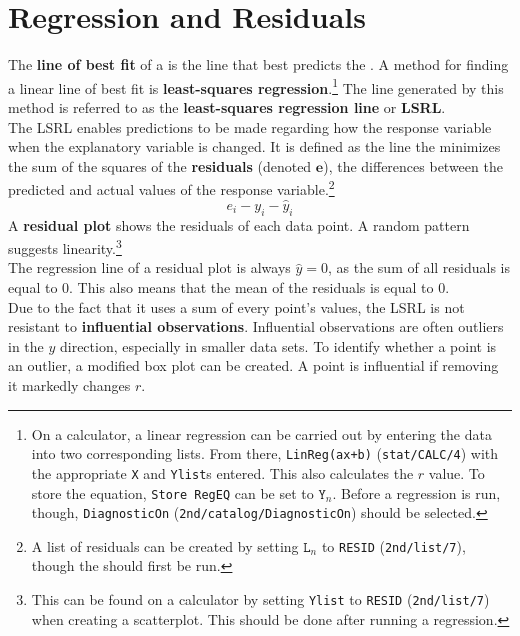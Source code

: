 \documentclass[../AP_Statistics.tex]{subfiles}
\begin{document}
		\section{Regression and Residuals}
			The \textbf{line of best fit} of a  is the line that best predicts the . A method for finding a linear line of best fit is \textbf{least-squares regression}.\footnote{On a calculator, a linear regression can be carried out by entering the data into two corresponding lists. From there, \texttt{LinReg(ax+b)} (\texttt{stat/CALC/4}) with the appropriate \texttt{X} and \texttt{Ylist}s entered. This also calculates the $r$ value. To store the equation, \texttt{Store RegEQ} can be set to $\texttt{Y}_n$. Before a regression is run, though, \texttt{DiagnosticOn} (\texttt{2nd/catalog/DiagnosticOn}) should be selected.} The line generated by this method is referred to as the \textbf{least-squares regression line} or \textbf{LSRL}. \\
			The LSRL enables predictions to be made regarding how the response variable when the explanatory variable is changed. It is defined as the line the minimizes the sum of the squares of the \textbf{residuals} (denoted $\bm{e}$), the differences between the predicted and actual values of the response variable.\footnote{A list of residuals can be created by setting $\texttt{L}_n$ to \texttt{RESID} (\texttt{2nd/list/7}), though the  should first be run.}
			\[e_i - y_i - \hat{y}_i\]
			A \textbf{residual plot} shows the residuals of each data point. A random pattern suggests linearity.\footnote{This can be found on a calculator by setting \texttt{Ylist} to \texttt{RESID} (\texttt{2nd/list/7}) when creating a scatterplot. This should be done after running a regression.} \\
			The regression line of a residual plot is always $\hat{y} = 0$, as the sum of all residuals is equal to 0. This also means that the mean of the residuals is equal to 0. \\
			Due to the fact that it uses a sum of every point's values, the LSRL is not resistant to \textbf{influential observations}. Influential observations are often outliers in the $y$ direction, especially in smaller data sets. To identify whether a point is an outlier, a modified box plot can be created. A point is influential if removing it markedly changes $r$. \\
\end{document}
